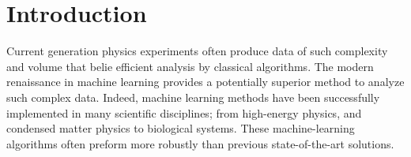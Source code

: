 \documentclass[prl,reprint,showpacs,floatfix,nofootinbib]{revtex4-1}
\begin{document}

\maketitle

\section{Introduction}
Current generation physics experiments often produce data of such complexity and volume that belie efficient analysis by classical algorithms\cite{radovic_machine_2018}. The modern renaissance in machine learning\cite{dey_machine_2016} provides a potentially superior method to analyze such complex data. Indeed, machine learning methods have been successfully implemented in many scientific disciplines; from  high-energy physics\cite{baldi_searching_2014}, and condensed matter physics\cite{deng_machine_2017,carrasquilla_machine_2017,beach_machine_2018,wang_machine_2017,walters_machine_2019} to biological systems\cite{tarca_machine_2007}. These machine-learning algorithms often preform more robustly than previous state-of-the-art solutions\cite{al-jarrah_efficient_2015}.

\end{document}
